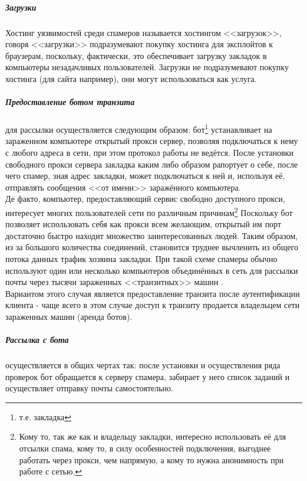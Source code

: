 \subparagraph{Загрузки\\}
Хостинг уязвимостей среди спамеров называется хостингом <<загрузок>>,
говоря <<загрузки>> подразумевают покупку хостинга для эксплойтов к
браузерам, поскольку, фактически, это обеспечивает загрузку закладок в
компьютеры незадачливых пользователей. Загрузки не подразумевают покупку
хостинга (для сайта например), они могут использоваться как услуга.

\subparagraph{Предоставление ботом транзита }
\label{bot_as_relay}
для рассылки осуществляется следующим образом: бот\footnote{т.е.
закладка}  устанавливает на зараженном компьютере открытый прокси
сервер, позволяя подключаться к нему с любого адреса в сети, при этом
протокол работы не ведётся. После установки свободного прокси сервера
закладка каким либо  образом рапортует о себе, после чего спамер, зная
адрес закладки,  может подключаться к ней и,  используя её, отправлять
сообщения <<от имени>> заражённого компьютера.\\  Де факто, компьютер,
предоставляющий сервис свободно  доступного прокси, интересует многих
пользователей сети по различным причинам\footnote{Кому то, так же как и
владельцу закладки, интересно использовать её для отсылки спама, кому
то, в силу особенностей подключения, выгоднее работать через прокси, чем
напрямую, а кому то нужна анонимность при работе с сетью.} Поскольку бот
позволяет использовать себя как прокси всем желающим, открытый им порт
достаточно быстро находит множество заинтересованных людей. Таким образом, из за
большого количества соединений, становится труднее вычленить из общего
потока данных трафик хозяина закладки.  При такой схеме спамеры обычно
используют один или несколько компьютеров объединённых в сеть для
рассылки почты через тысячи зараженных <<транзитных>> машин .\\
Вариантом этого случая является предоставление транзита после аутентификации
 клиента - чаще всего в этом случае доступ к транзиту продается владельцем
сети зараженных машин (аренда ботов).

\subparagraph{Рассылка с бота}
осуществляется в общих чертах так: после установки и осуществления ряда
проверок бот обращается к серверу спамера, забирает у него список
заданий и осуществляет отправку почты самостоятельно.

